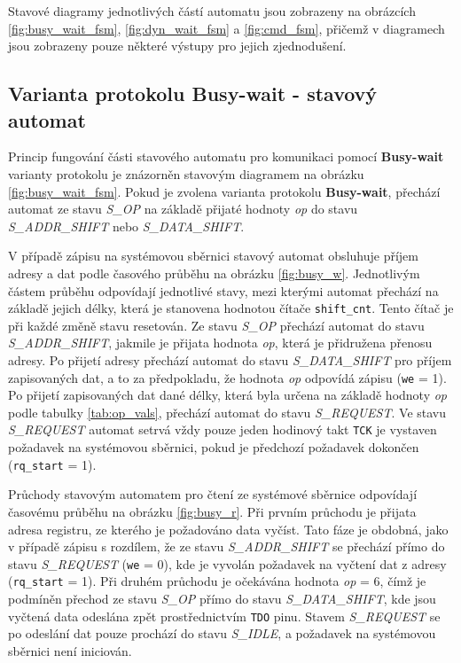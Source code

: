 Stavové diagramy jednotlivých částí automatu jsou zobrazeny na obrázcích \ref{fig:busy_wait_fsm}, \ref{fig:dyn_wait_fsm} a \ref{fig:cmd_fsm}, přičemž v diagramech jsou zobrazeny pouze některé výstupy pro jejich zjednodušení.

\subsection{Varianta protokolu Busy-wait - stavový automat} \label{subsec:busy-wait-fsm}
Princip fungování části stavového automatu pro komunikaci pomocí \textbf{Busy-wait} varianty protokolu je znázorněn stavovým diagramem na obrázku \ref{fig:busy_wait_fsm}. Pokud je zvolena varianta protokolu \textbf{Busy-wait}, přechází automat ze stavu \textit{S\_OP} na základě přijaté hodnoty \textit{op} do stavu \textit{S\_ADDR\_SHIFT} nebo \textit{S\_DATA\_SHIFT}.

V případě zápisu na systémovou sběrnici stavový automat obsluhuje příjem adresy a dat podle časového průběhu na obrázku \ref{fig:busy_w}. Jednotlivým částem průběhu odpovídají jednotlivé stavy, mezi kterými automat přechází na základě jejich délky, která je stanovena hodnotou čítače \texttt{shift\_cnt}. Tento čítač je při každé změně stavu resetován. Ze stavu \textit{S\_OP} přechází automat do stavu \textit{S\_ADDR\_SHIFT}, jakmile je přijata hodnota \textit{op}, která je přidružena přenosu adresy. Po přijetí adresy přechází automat do stavu \textit{S\_DATA\_SHIFT} pro příjem zapisovaných dat, a to za předpokladu, že hodnota \textit{op} odpovídá zápisu (\texttt{we} = 1). Po přijetí zapisovaných dat dané délky, která byla určena na základě hodnoty \textit{op} podle tabulky \ref{tab:op_vals}, přechází automat do stavu \textit{S\_REQUEST}. Ve stavu \textit{S\_REQUEST} automat setrvá vždy pouze jeden hodinový takt \texttt{\acs{TCK}} je vystaven požadavek na systémovou sběrnici, pokud je předchozí požadavek dokončen (\texttt{rq\_start} = 1).

Průchody stavovým automatem pro čtení ze systémové sběrnice odpovídají časovému průběhu na obrázku \ref{fig:busy_r}. Při prvním průchodu je přijata adresa registru, ze kterého je požadováno data vyčíst. Tato fáze je obdobná, jako v případě zápisu s rozdílem, že ze stavu \textit{S\_ADDR\_SHIFT} se přechází přímo do stavu \textit{S\_REQUEST} (\texttt{we} = 0), kde je vyvolán požadavek na vyčtení dat z adresy (\texttt{rq\_start} = 1). Při druhém průchodu je očekávána hodnota \textit{op} = 6, čímž je podmíněn přechod ze stavu \textit{S\_OP} přímo do stavu \textit{S\_DATA\_SHIFT}, kde jsou vyčtená data odeslána zpět prostřednictvím \texttt{\acs{TDO}} pinu. Stavem \textit{S\_REQUEST} se po odeslání dat pouze prochází do stavu \textit{S\_IDLE}, a požadavek na systémovou sběrnici není iniciován.

